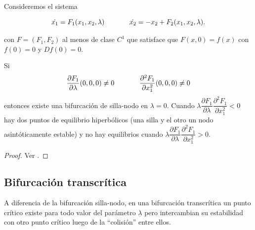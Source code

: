 \begin{theorem}Consideremos el sistema

$$ \dot{x_1} = F_1(x_1, x_2, \lambda) \hspace{0.5in} \dot{x_2} = -x_2 + F_2(x_1, x_2, \lambda). $$

con $F=(F_1,F_2)$ al menos de clase $C^1$ que satisface que $F(x,0) = f(x)$ con $f(0) = 0$ y $Df(0) = 0$.

Si
$$
	\dfrac{\partial F_1}{\partial \lambda}(0,0,0) \neq 0 \hspace{0.5in}
	\dfrac{\partial^2 F_1}{\partial x_1^2}(0,0,0) \neq 0	
$$
entonces existe una bifurcación de silla-nodo en $\lambda = 0$.
Cuando $\lambda \dfrac{\partial F_1}{\partial \lambda} \dfrac{\partial^2 F_1}{\partial x_1^2} < 0$ hay dos puntos de equilibrio hiperbólicos (una silla y el otro un nodo asintóticamente estable) y no hay equilibrios cuando $\lambda \dfrac{\partial F_1}{\partial \lambda} \dfrac{\partial^2 F_1}{\partial x_1^2} > 0$.
\begin{proof}
Ver \cite[p.~316]{dynandbif}.
\end{proof}
\end{theorem}


\subsection{Bifurcación transcrítica}

A diferencia de la bifurcación silla-nodo, en una bifurcación transcrítica un punto crítico existe para todo valor del parámetro $\lambda$ pero intercambian su estabilidad con otro punto crítico luego de la ``colisión'' entre ellos.

